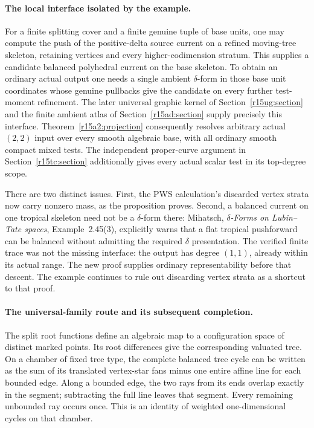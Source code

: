 \paragraph{The local interface isolated by the example.}
For a finite splitting cover and a finite genuine tuple of base
units, one may compute the push of the positive-delta source
current on a refined moving-tree skeleton, retaining vertices
and every higher-codimension stratum.  This supplies a candidate
balanced polyhedral current on the base skeleton.  To obtain an
ordinary actual output one needs a single ambient
$\delta$-form in those base unit coordinates whose genuine
pullbacks give the candidate on every further test-moment
refinement.  The later universal graphic kernel of
Section~\ref{r15ug:section} and the finite ambient atlas of
Section~\ref{r15ad:section} supply precisely this interface.
Theorem~\ref{r15a2:projection} consequently resolves arbitrary
actual $(2,2)$ input over every smooth algebraic base, with
all ordinary smooth compact mixed tests.  The independent
proper-curve argument in Section~\ref{r15tc:section} additionally
gives every actual scalar test in its top-degree scope.

There are two distinct issues.  First, the PWS calculation's
discarded vertex strata now carry nonzero mass, as the
proposition proves.  Second, a balanced current on one tropical
skeleton need not be a $\delta$-form there: Mihatsch,
\emph{$\delta$-Forms on Lubin--Tate spaces}, Example~2.45(3),
explicitly warns that a flat tropical pushforward can be
balanced without admitting the required $\delta$ presentation.
The verified finite trace was not the missing interface: the
output has degree $(1,1)$, already within its actual range.
The new proof supplies ordinary representability before that
descent.  The example continues to rule out discarding vertex
strata as a shortcut to that proof.

\paragraph{The universal-family route and its subsequent completion.}
The split root functions define an algebraic map to a
configuration space of distinct marked points.  Its root
differences give the corresponding valuated tree.  On a chamber
of fixed tree type, the complete balanced tree cycle can be
written as the sum of its translated vertex-star fans minus
one entire affine line for each bounded edge.  Along a bounded
edge, the two rays from its ends overlap exactly in the segment;
subtracting the full line leaves that segment.  Every remaining
unbounded ray occurs once.  This is an identity of weighted
one-dimensional cycles on that chamber.

